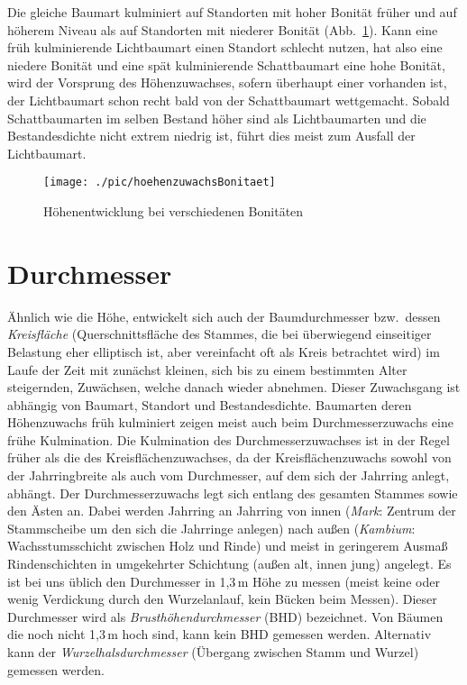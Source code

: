 \documentclass[twocolumn]{scrartcl}
\begin{document}
Die gleiche Baumart kulminiert auf Standorten mit hoher Bonität früher und auf
höherem Niveau als auf Standorten mit niederer Bonität
(Abb.~\ref{fig:hoeheAlterBonitaeten}). Kann eine früh kulminierende Lichtbaumart
einen Standort schlecht nutzen, hat also eine niedere Bonität und eine spät
kulminierende Schattbaumart eine hohe Bonität, wird der Vorsprung des
Höhenzuwachses, sofern überhaupt einer vorhanden ist, der Lichtbaumart schon
recht bald von der Schattbaumart wettgemacht. Sobald Schattbaumarten im selben
Bestand höher sind als Lichtbaumarten und die Bestandesdichte nicht extrem
niedrig ist, führt dies meist zum Ausfall der Lichtbaumart.

\begin{figure}[htbp]
  \centering
  \texttt{[image: ./pic/hoehenzuwachsBonitaet]}
  \caption{Höhenentwicklung bei verschiedenen Bonitäten}
  \label{fig:hoeheAlterBonitaeten}
\end{figure}


\section{Durchmesser}

Ähnlich wie die Höhe, entwickelt sich auch der Baumdurchmesser bzw.\ dessen
\emph{Kreisfläche} (Querschnittsfläche des Stammes, die bei
überwiegend einseitiger Belastung eher elliptisch ist, aber vereinfacht oft als
Kreis betrachtet wird) im Laufe der Zeit mit zunächst kleinen, sich bis zu einem
bestimmten Alter steigernden, Zuwächsen, welche danach wieder abnehmen. Dieser
Zuwachsgang ist abhängig von Baumart, Standort und Bestandesdichte. Baumarten
deren Höhenzuwachs früh kulminiert zeigen meist auch beim Durchmesserzuwachs
eine frühe Kulmination. Die Kulmination des Durchmesserzuwachses ist in der
Regel früher als die des Kreisflächenzuwachses, da der Kreisflächenzuwachs
sowohl von der Jahrringbreite als auch vom Durchmesser, auf dem sich der
Jahrring anlegt, abhängt. Der Durchmesserzuwachs legt sich entlang des gesamten
Stammes sowie den Ästen an. Dabei werden Jahrring an Jahrring von innen
(\emph{Mark}: Zentrum der Stammscheibe um den sich die Jahrringe
anlegen) nach außen (\emph{Kambium}: Wachsstumsschicht zwischen
Holz und Rinde) und meist in geringerem Ausmaß Rindenschichten in umgekehrter
Schichtung (außen alt, innen jung) angelegt. Es ist bei uns üblich den
Durchmesser in 1,3\,m Höhe zu messen (meist keine oder wenig Verdickung durch
den Wurzelanlauf, kein Bücken beim Messen). Dieser Durchmesser wird als
\emph{Brusthöhendurchmesser}
(BHD) bezeichnet. Von Bäumen die noch nicht
1,3\,m hoch sind, kann kein BHD gemessen werden. Alternativ kann der
\emph{Wurzelhalsdurchmesser} (Übergang zwischen
Stamm und Wurzel) gemessen werden.
\end{document}
